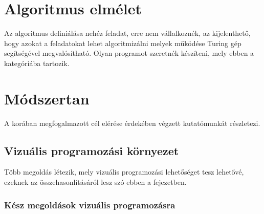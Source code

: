 \documentclass[12pt,a4paper,oneside]{report} %
\begin{document}
\section{Algoritmus elmélet}
Az algoritmus definiálása nehéz feladat, erre nem vállalkoznék, az kijelenthető, hogy azokat a feladatokat lehet algoritmizálni melyek működése Turing gép segítségével megvalósítható. Olyan programot szeretnék készíteni, mely ebben a kategóriába tartozik. 
\section{Módszertan}
\label{modtan}
A korában megfogalmazott cél elérése érdekében végzett kutatómunkát részletezi.
\subsection{Vizuális programozási környezet}
\label{vizuprogkor}
Több megoldás létezik, mely vizuális programozási lehetőséget tesz lehetővé, ezeknek az összehasonlításáról lesz szó ebben a fejezetben. 
\subsubsection{Kész megoldások vizuális programozásra} 
\end{document}

